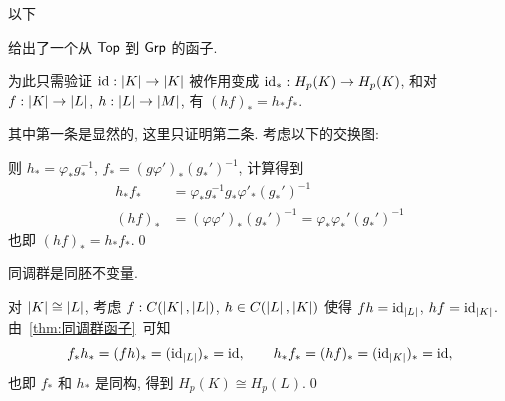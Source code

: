 \begin{Theorem}\label{thm:同调群函子}
	以下
	\begin{center}
	\end{center}
	给出了一个从 $ \mathsf{Top} $ 到 $ \mathsf{Grp} $ 的函子.
\end{Theorem}
\begin{Proof}
	为此只需验证 $ \mathrm{id} : \left| K \right| \to\left| K \right|  $ 被作用变成 $ \mathrm{id}_* : H_p(K)\to H_p(K) $, 和对 $ f : \left| K \right| \to \left| L \right|  $, $ h : \left| L \right| \to\left| M \right|  $, 有 $ (hf)_*=h_*f_* $.

	其中第一条是显然的, 这里只证明第二条. 考虑以下的交换图:
	\begin{center}
	\end{center}
	则 $ h_*=\varphi_*g_*^{-1} $, $ f_*=(g\varphi')_*(g_*')^{-1} $, 计算得到
	\[
		\begin{aligned}
			h_*f_*&=\varphi_*g_*^{-1}g_*\varphi'_*(g_*')^{-1}\\
			(hf)_*&=(\varphi\varphi')_*(g_*')^{-1}=\varphi_*\varphi_*'(g_*')^{-1}
		\end{aligned}
	\]
	也即 $ (hf)_*=h_*f_* $.\qed
\end{Proof}

\begin{Corollary}
	同调群是同胚不变量.
\end{Corollary}
\begin{Proof}
	对 $ \left| K \right| \cong\left| L \right|  $, 考虑 $ f : C(\left| K \right| ,\left| L \right| ) $, $ h\in C(\left| L \right| ,\left| K \right| ) $ 使得 $ fh=\mathrm{id}_{\left| L \right| } $, $ hf=\mathrm{id}_{\left| K \right| } $. 由~\ref{thm:同调群函子}~可知
	\[
		f_*h_*=(fh)_*=(\mathrm{id}_{\left| L \right| })_*=\mathrm{id},\qquad h_*f_*=(hf)_*=(\mathrm{id}_{\left| K \right| })_*=\mathrm{id},
	\]
	也即 $ f_* $ 和 $ h_* $ 是同构, 得到 $ H_p(K)\cong H_p(L) $.\qed
\end{Proof}

